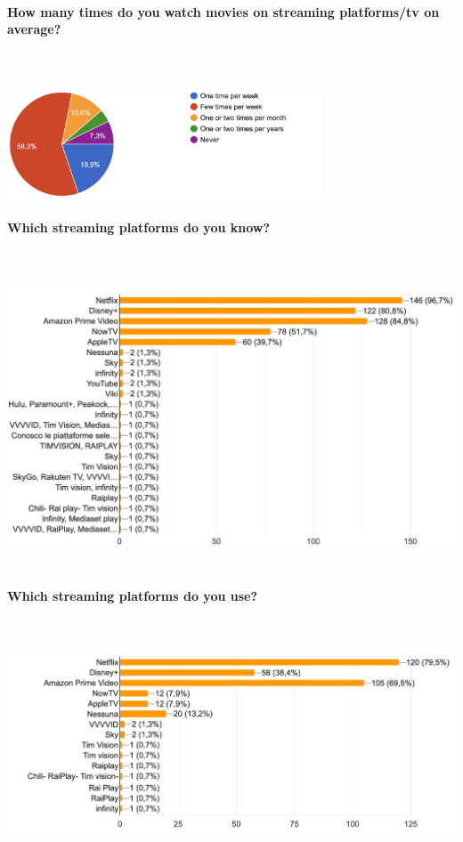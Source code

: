 \documentclass[12pt, a4paper]{article}
\numberwithin{figure}{section}
\begin{document}
\paragraph{How many times do you watch movies on streaming platforms/tv on average?}\mbox{}\\\\
\includegraphics[width=0.7\textwidth]{Images/timeStreaming.png}\\

\paragraph{Which streaming platforms do you know?}\mbox{}\\\\
\includegraphics[width=1\textwidth]{Images/streamingPlatform.png}\\\\

\paragraph{Which streaming platforms do you use?}\mbox{}\\\\
\includegraphics[width=1\textwidth]{Images/streamingPlatformUsed.png}\\
\end{document}
